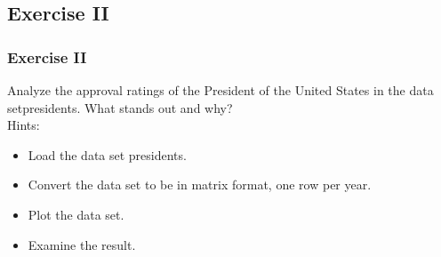 %





\subsection{Exercise II}
\begin{frame}[fragile]
	\frametitle{Exercise II}
	Analyze the approval ratings of the President of the United States in the data set\ttfamily presidents. \normalfont  What stands out and why?\\
  \vspace{10pt}
  \noindent Hints: \small
    \begin{itemize}
      \item Load the data set \ttfamily presidents.\normalfont
      \item Convert the data set to be in matrix format, one row per year.
      \item Plot the data set.
      \item Examine the result.
    \end{itemize}
    \normalsize
\end{frame}
